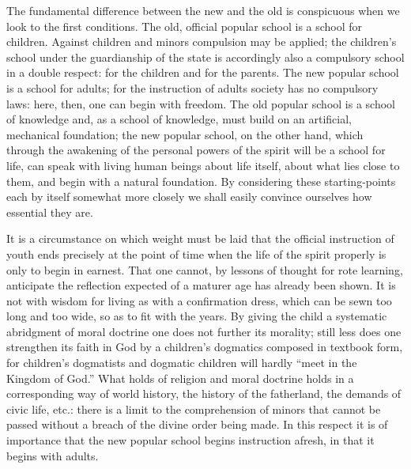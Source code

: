\documentclass[12pt,a4paper,openany]{book}
\newcommand{\opage}[1]{\marginnote{\footnotesize\textit{[#1]}}}
\begin{document}
The fundamental difference between the new and the old is
conspicuous when we look to the first conditions.
The old, official popular school is a school for children. Against
children and minors compulsion may be applied; the children's school
under the guardianship of the state is accordingly also a compulsory school
in a double respect: for the children and for the
\setcounter{footnote}{0}%
\opage{412}parents. The new popular school is a school for adults;
for the instruction of adults society has no compulsory laws:
here, then, one can begin with freedom. The old
popular school is a school of knowledge and, as a school of knowledge,
must build on an artificial, mechanical foundation;
the new popular school, on the other hand, which through the awakening of
the personal powers of the spirit will be a school for life,
can speak with living human beings about life itself, about
what lies close to them, and begin with a natural
foundation. By considering these starting-points
each by itself somewhat more closely we shall easily convince ourselves
how essential they are.

It is a circumstance on which weight must be laid
that the official instruction of youth ends precisely
at the point of time when the life of the spirit properly
is only to begin in earnest. That one cannot, by lessons of thought
for rote learning, anticipate the reflection
expected of a maturer age has already been shown. It
is not with wisdom for living as with a confirmation dress, which
can be sewn too long and too wide, so as to fit with the years.
By giving the child a systematic abridgment of
moral doctrine one does not further its morality; still
less does one strengthen its faith in God by a children's dogmatics
composed in textbook form, for children's dogmatists
and dogmatic children will hardly ``meet in the Kingdom of God.''
What holds of religion and moral doctrine holds in
a corresponding way of world history, the history of the fatherland,
the demands of civic life, etc.: there is a limit
to the comprehension of minors that cannot be passed
without a breach of the divine order being made.
In this respect it is of importance that the new
\setcounter{footnote}{0}%
\opage{413}popular school begins instruction afresh, in that it begins
with adults.
\end{document}
